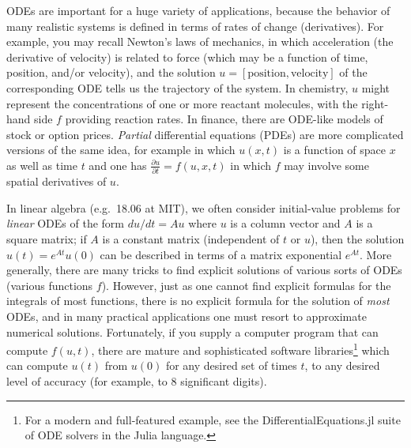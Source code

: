 ODEs are important for a huge variety of applications, because the
behavior of many realistic systems is defined in terms of rates of
change (derivatives). For example, you may recall Newton's laws of
mechanics, in which acceleration (the derivative of velocity) is related
to force (which may be a function of time, position, and/or velocity),
and the solution $u=[\text{position},\text{velocity}]$ of the corresponding
ODE tells us the trajectory of the system. In chemistry, $u$ might
represent the concentrations of one or more reactant molecules, with
the right-hand side $f$ providing reaction rates. In finance, there
are ODE-like models of stock or option prices. \emph{Partial} differential
equations (PDEs) are more complicated versions of the same idea, for
example in which $u(x,t)$ is a function of space $x$ as well as
time $t$ and one has $\frac{\partial u}{\partial t}=f(u,x,t)$ in which $f$ may involve some spatial derivatives of $u$. 

In linear algebra (e.g.~18.06 at MIT), we often consider initial-value
problems for \emph{linear} ODEs of the form $du/dt=Au$ where $u$ is a column
vector and $A$ is a square matrix; if $A$ is a constant matrix (independent
of $t$ or $u$), then the solution $u(t)=e^{At}u(0)$ can be described in terms of a matrix exponential $e^{At}$.
More generally, there are many tricks to find explicit solutions of
various sorts of ODEs (various functions $f$). However, just as one
cannot find explicit formulas for the integrals of most functions,
there is no explicit formula for the solution of \emph{most} ODEs,
and in many practical applications one must resort to approximate
numerical solutions. Fortunately, if you supply a computer program
that can compute $f(u,t)$, there are mature and sophisticated software
libraries\footnote{For a modern and full-featured example, see the DifferentialEquations.jl
suite of ODE solvers in the Julia language.} which can compute $u(t)$ from $u(0)$ for any desired set of times
$t$, to any desired level of accuracy (for example, to 8 significant
digits).

